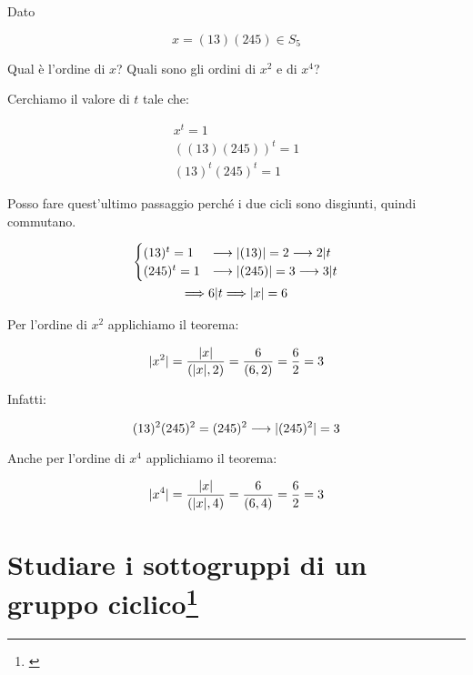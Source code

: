 \begin{esercizio}
	Dato
	
	\begin{equation}
		x = (13)(245) \in S_5
	\end{equation}
	
	Qual è l'ordine di $x$? Quali sono gli ordini di $x^2$ e di $x^4$?	
\end{esercizio}
\begin{dimostrazione}
	Cerchiamo il valore di $t$ tale che:
	
	\begin{gather}
		x^t = 1 \\
		((13)(245))^t = 1 \\
		(13)^t(245)^t = 1
	\end{gather}

	Posso fare quest'ultimo passaggio perché i due cicli sono disgiunti, quindi commutano.
	
	\begin{gather}
		\begin{cases}
			(13)^t = 1 &\longrightarrow \lvert (13) \rvert = 2 \longrightarrow 2|t \\
			(245)^t= 1 &\longrightarrow \lvert (245) \rvert= 3 \longrightarrow 3|t
		\end{cases}	\\
		\Longrightarrow 6|t
		\Longrightarrow \lvert x \rvert = 6
	\end{gather}

	Per l'ordine di $x^2$ applichiamo il teorema:
	
	\begin{equation}
		\lvert x^2 \rvert = \dfrac{\lvert x \rvert}{ ( \lvert x \rvert , 2 ) } = \dfrac{6}{ ( 6 , 2 ) } = \dfrac{6}{2} = 3
	\end{equation}

	Infatti:
	
	\begin{equation}
		(13)^2(245)^2 = (245)^2 \longrightarrow \lvert (245)^2 \rvert = 3
	\end{equation}

	Anche per l'ordine di $x^4$ applichiamo il teorema:
	
	\begin{equation}
		\lvert x^4 \rvert = \dfrac{\lvert x \rvert}{ ( \lvert x \rvert , 4 ) } = \dfrac{6}{ ( 6 , 4 ) } = \dfrac{6}{2} = 3
	\end{equation}
\end{dimostrazione}

\section[Studiare i sottogruppi di un gruppo ciclico]{Studiare i sottogruppi di un gruppo ciclico\footnote{\cite[1 ottobre 2021]{lucchini}}}

